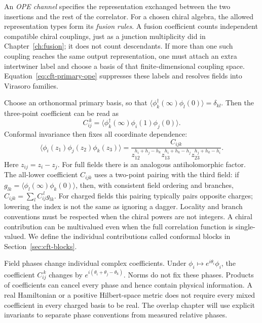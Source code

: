 An \emph{OPE channel} specifies the representation exchanged between
the two insertions and the rest of the correlator. For a chosen chiral
algebra, the allowed representation types form its \emph{fusion
rules}. A fusion coefficient counts independent compatible chiral
couplings, just as a junction multiplicity did in
Chapter~\ref{ch:fusion}; it does not count descendants. If more
than one such coupling reaches the same output representation, one
must attach an extra intertwiner label and choose a basis of that
finite-dimensional coupling space. Equation~\eqref{eq:cft-primary-ope}
suppresses these labels and resolves fields into Virasoro families.

Choose an orthonormal primary basis, so that
$\langle\phi_k^\dagger(\infty)\phi_l(0)\rangle=\delta_{kl}$.
Then the three-point coefficient can be read as
\[
 C_{ij}^{\ k}
 =\langle\phi_k^\dagger(\infty)\phi_i(1)\phi_j(0)\rangle.
\]
Conformal invariance then fixes all coordinate dependence:
\begin{equation}
 \langle\phi_i(z_1)\phi_j(z_2)\phi_k(z_3)\rangle
 =\frac{C_{ijk}}
 {z_{12}^{h_i+h_j-h_k}
  z_{13}^{h_i+h_k-h_j}
  z_{23}^{h_j+h_k-h_i}}.
 \label{eq:cft-threepoint}
\end{equation}
Here $z_{ij}=z_i-z_j$. For full fields there is an analogous
antiholomorphic factor.
The all-lower coefficient $C_{ijk}$ uses a two-point pairing with
the third field: if $g_{lk}=\langle\phi_l(\infty)\phi_k(0)\rangle$,
then, with consistent field ordering and branches,
$C_{ijk}=\sum_l C_{ij}^{\ l}g_{lk}$.
For charged fields this pairing typically pairs opposite charges;
lowering the index is not the same as ignoring a dagger.
Locality and branch conventions must be respected when the chiral
powers are not integers. A chiral contribution can be multivalued even
when the full correlation function is single-valued. We define the
individual contributions called conformal blocks in
Section~\ref{sec:cft-blocks}.

Field phases change individual complex coefficients. Under
$\phi_i\mapsto e^{i\theta_i}\phi_i$, the coefficient
$C_{ij}^{\ k}$ changes by
$e^{i(\theta_i+\theta_j-\theta_k)}$. Norms do not fix these phases.
Products of coefficients can cancel every phase and hence contain
physical information. A real Hamiltonian or a positive Hilbert-space
metric does not require every mixed coefficient in every charged
basis to be real. The overlap chapter will use explicit invariants
to separate phase conventions from measured relative phases.

